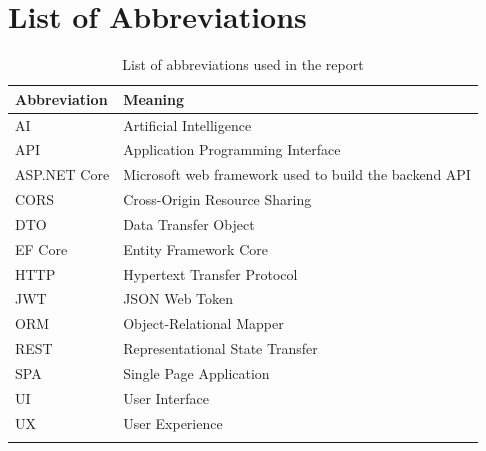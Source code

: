 \chapter*{List of Abbreviations}

\begin{longtable}{|m{3.2cm}|m{10.5cm}|}
\hline
\textbf{Abbreviation} & \textbf{Meaning} \\
\hline
AI & Artificial Intelligence \\
\hline
API & Application Programming Interface \\
\hline
ASP.NET Core & Microsoft web framework used to build the backend API \\
\hline
CORS & Cross-Origin Resource Sharing \\
\hline
DTO & Data Transfer Object \\
\hline
EF Core & Entity Framework Core \\
\hline
HTTP & Hypertext Transfer Protocol \\
\hline
JWT & JSON Web Token \\
\hline
ORM & Object-Relational Mapper \\
\hline
REST & Representational State Transfer \\
\hline
SPA & Single Page Application \\
\hline
UI & User Interface \\
\hline
UX & User Experience \\
\hline
\caption{List of abbreviations used in the report}\\
\end{longtable}
